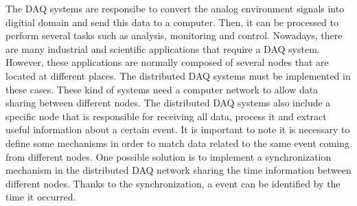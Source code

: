 The DAQ \cite{daq:book1} systems are responsibe to convert the analog environment signals into digitial domain and send this data to a computer. Then, it can be processed to perform several tasks such as analysis, monitoring and control. Nowadays, there are many industrial \cite{daq:res} and scientific applications \cite{daq:sensor-networks} that require a DAQ system. However, these applications are normally composed of several nodes that are located at different places. The distributed DAQ systems must be implemented in these cases. These kind of systems need a computer network to allow data sharing between different nodes. The distributed DAQ systems also include a specific node that is responsible for receiving all data, process it and extract useful information about a certain event. It is important to note it is necessary to define some mechanisms in order to match data related to the same event coming from different nodes. One possible solution is to implement a synchronization mechanism in the distributed DAQ network sharing the time information between different nodes. Thanks to the synchronization, a event can be identified by the time it occurred.


